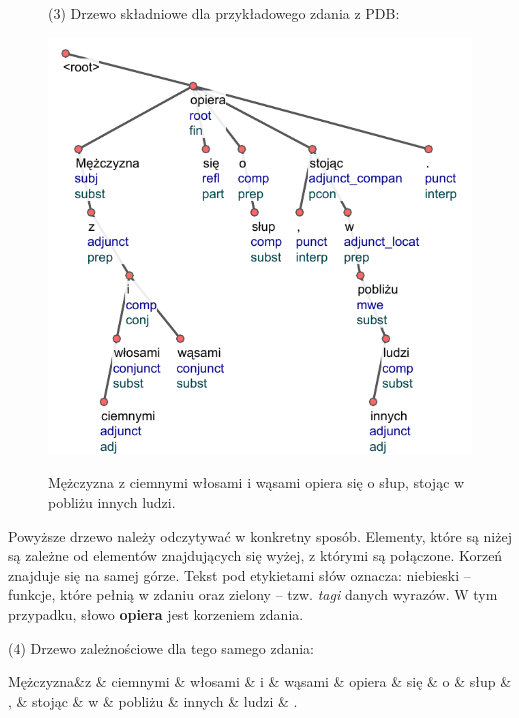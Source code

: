 \documentclass[licencjacka]{pracamgr_Kogni}
\begin{document}
\begin{figure}
    \hspace{0.7cm}(3) Drzewo składniowe dla przykładowego zdania z PDB:

    \includegraphics{drzewko.pdf}

    Mężczyzna z ciemnymi włosami i wąsami opiera się o słup, stojąc w pobliżu innych ludzi.
\end{figure}

Powyższe drzewo należy odczytywać w konkretny sposób. Elementy, które są niżej są zależne od elementów znajdujących się wyżej, z którymi są połączone. Korzeń znajduje się na samej górze. Tekst pod etykietami słów oznacza: niebieski -- funkcje, które pełnią w zdaniu oraz zielony -- tzw. \textit{tagi} danych wyrazów. W tym przypadku, słowo \textbf{opiera} jest korzeniem zdania.

(4) Drzewo zależnościowe dla tego samego zdania:

\begin{dependency}[theme=simple]
    \hspace{-2.5cm}
    \begin{deptext}[column sep=0.1cm]
Mężczyzna\&z \& ciemnymi \& włosami \& i \& wąsami \& opiera \& się \& o \& słup \& , \& stojąc \& w \& pobliżu \& innych \& ludzi \& . \\
    \end{deptext}
\end{dependency}
\end{document}
